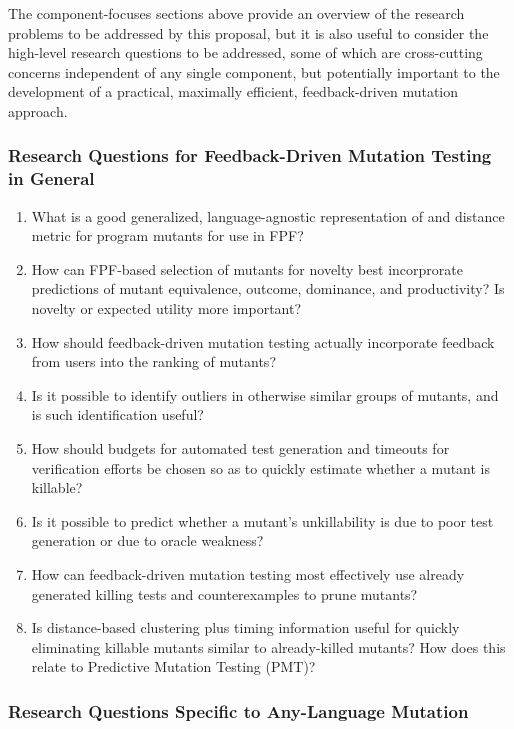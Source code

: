 The component-focuses sections above provide an overview of the
research problems to be addressed by this proposal, but it is also
useful to consider the high-level research questions to be addressed,
some of which are cross-cutting concerns independent of any single
component, but potentially important to the development of a
practical, maximally efficient, feedback-driven mutation approach.

\subsubsection{Research Questions for Feedback-Driven Mutation Testing
in General}

\begin{enumerate}
\item What is a good generalized, language-agnostic representation
  of and distance metric for program mutants for use in FPF?
\item How can FPF-based selection of mutants for novelty best incorprorate
  predictions of mutant equivalence, outcome, dominance, and
  productivity?  Is novelty or expected utility more important?
\item How should feedback-driven mutation testing actually incorporate feedback from users into the 
  ranking of mutants? 
\item Is it possible to identify outliers in otherwise similar groups of
  mutants, and is such identification useful?
\item How should budgets for automated test generation and
  timeouts for verification efforts be chosen so as to quickly estimate whether a
  mutant is killable?
\item Is it possible to predict whether a mutant's unkillability is due to poor test 
  generation  or due to oracle weakness? 
\item How can feedback-driven mutation testing most effectively use already generated killing tests
  and counterexamples to prune mutants?
\item Is distance-based clustering plus timing information useful for quickly
  eliminating killable mutants similar to already-killed mutants?  How
  does this relate to Predictive Mutation Testing (PMT)?

\end{enumerate}

\subsubsection{Research Questions Specific to Any-Language Mutation}

